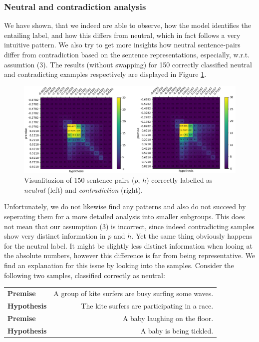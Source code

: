 \subsubsection{Neutral and contradiction analysis}\label{sec:understanding_align_neutral_contr}
We have shown, that we indeed are able to observe, how the model identifies the entailing label, and how this differs from neutral, which in fact follows a very intuitive pattern. We also try to get more insights how neutral sentence-pairs  differ from contradiction based on the sentence representations, especially, w.r.t. assumtion (3). The results (without swapping) for 150 correctly classified neutral and contradicting examples respectively are displayed in Figure \ref{fig:neutr_contr_uninversed}.
\begin{figure}[tph!]	\centering
\includegraphics[totalheight=7cm]{fig/neutr_contr_uninversed.png}
	\caption{Visualitazion of 150 sentence pairs ($p$, $h$) correctly labelled as \textit{neutral} (left) and \textit{contradiction} (right).}
	\label{fig:neutr_contr_uninversed}
\end{figure} 
Unfortunately, we do not likewise find any patterns and also do not succeed by seperating them for a more detailed analysis into smaller subgroups. This does not mean that our assumption (3) is incorrect, since indeed contradicting samples show very distinct information in $p$ and $h$. Yet the same thing obviously happens for the neutral label. It  might be slightly less distinct information when looing at the absolute numbers, however this difference is far from being representative. We find an explanation for this issue by looking into the samples. Consider the following two samples, classified correctly as neutral:
\begin{center}
\begin{tabular}{lr}
\textbf{Premise} & A group of kite surfers are busy surfing some waves. \\
\textbf{Hypothesis} & The kite surfers are participating in a race. \\
\midrule
\textbf{Premise} & A baby laughing on the floor. \\
\textbf{Hypothesis} & A baby is being tickled.
\end{tabular}
\end{center}
